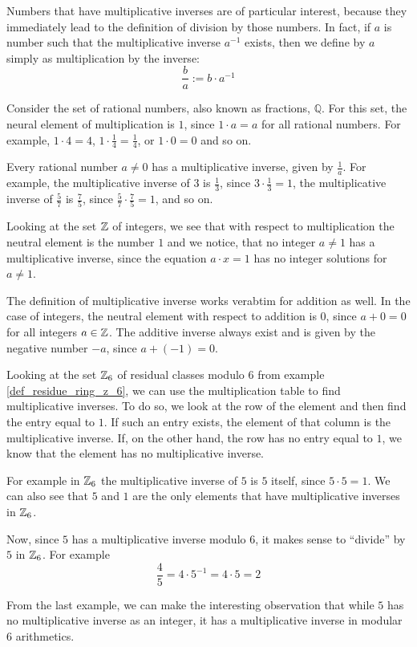 Numbers that have multiplicative inverses are of particular interest, because they immediately lead to the definition of division by those numbers. In fact, if $a$ is number such that the multiplicative inverse $a^{-1}$ exists, then we define  by $a$ simply as multiplication by the inverse:
\begin{equation}
\frac{b}{a}:= b\cdot a^{-1}
\end{equation}
\begin{example} Consider the set of rational numbers, also known as fractions, $\mathbb{Q}$. For this set, the neural element of multiplication is $1$, since $1\cdot a = a$ for all rational numbers. For example, $1\cdot 4=4$, $1\cdot \frac{1}{4}=\frac{1}{4}$, or $1\cdot 0 =0$ and so on.

Every rational number $a\neq 0$ has a multiplicative inverse, given by $\frac{1}{a}$. 
For example, the multiplicative inverse of $3$ is $\frac{1}{3}$, since $3\cdot \frac{1}{3}=1$, the multiplicative inverse of $\frac{5}{7}$ is $\frac{7}{5}$, since $\frac{5}{7}\cdot \frac{7}{5}=1$, and so on. 
\end{example}
\begin{example}Looking at  the set $\mathbb{Z}$ of integers, we see that with respect to multiplication the neutral element is the number $1$ and we notice, that no integer $a\neq 1$ has a multiplicative inverse, since the equation $a\cdot x =1$ has no integer solutions for $a\neq 1$. 

The definition of multiplicative inverse works verabtim for addition as well. In the case of integers, the neutral element with respect to addition is $0$, since $a+0=0$ for all integers $a\in\mathbb{Z}$. The additive inverse always exist and is given by the negative number $-a$, since $a+(-1)=0$.  
\end{example}
\begin{example} Looking at the set $\mathbb{Z}_6$ of residual classes modulo $6$ from example \ref{def_residue_ring_z_6}, we can use the multiplication table to find multiplicative inverses. To do so, we look at the row of the element and then find the entry equal to $1$. If such an entry exists, the element of that column is the multiplicative inverse. If, on the other hand, the row has no entry equal to $1$, we know that the element has no multiplicative inverse.

For example in $\mathbb{Z}_6$ the multiplicative inverse of $5$ is $5$ itself, since $5\cdot 5=1$. We can also see that $5$ and $1$ are the only elements that have multiplicative inverses in $\mathbb{Z}_6$. 

Now, since $5$ has a multiplicative inverse modulo $6$, it makes sense to ``divide'' by $5$ in $\mathbb{Z}_6$. For example
$$
\frac{4}{5}= 4\cdot 5^{-1} = 4\cdot 5 = 2
$$ 
\end{example}
From the last example, we can make the interesting observation that while $5$ has no multiplicative inverse as an integer, it has a multiplicative inverse in modular $6$ arithmetics. 

